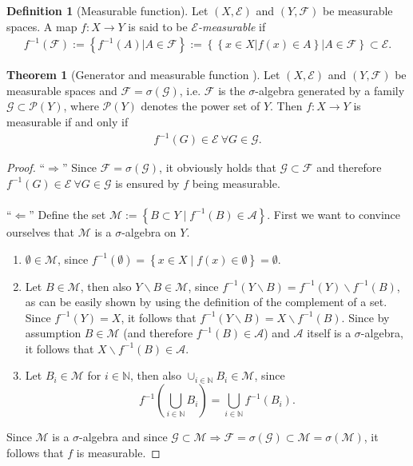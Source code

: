\documentclass[12pt, a4paper]{article}
\numberwithin{equation}{section}
\theoremstyle{definition}
\theoremstyle{definition}
\newtheorem{defn}[thm]{Definition} %
\newtheorem{theorem}[thm]{Theorem}
\begin{document}
	\begin{defn}[Measurable function]
		Let $(X, \mathcal E)$ and $(Y, \mathcal F)$ be measurable spaces. A map $f: X\rightarrow Y$ is said to be \textit{$\mathcal E$-measurable} if 
		\begin{align} \label{measurable-mapping-eq}
			f^{-1}(\mathcal F) := \left\{ f^{-1}(A) \vert A\in \mathcal F \right\} := \left\{ \left\{ x\in X \vert f(x) \in A \right\} \vert A\in \mathcal F \right\} \subset \mathcal E.
		\end{align} 
	\end{defn}

	\begin{theorem}[Generator and measurable function \cite{measurable-functions}] \label{generator-and-measurable-function} Let $(X, \mathcal E)$ and $(Y, \mathcal F)$ be measurable spaces and $\mathcal F = \sigma(\mathcal G)$, i.e. $\mathcal F$ is the $\sigma$-algebra generated by a family $\mathcal G \subset \mathcal P(Y)$, where $\mathcal P(Y)$ denotes the power set of $Y$. Then $f: X\rightarrow Y$ is measurable if and only if 
		\begin{align}
			f^{-1}\left(G\right) \in \mathcal E \ \forall G\in\mathcal G. 
		\end{align}
	\end{theorem}
	
	\begin{proof}
		\enquote{$\Rightarrow$} Since $\mathcal F = \sigma(\mathcal G)$, it obviously holds that $\mathcal G\subset \mathcal F$ and therefore $f^{-1}(G)\in \mathcal E \ \forall G\in\mathcal G$ is ensured by $f$ being measurable. 
		\\ \\ 
		\enquote{$\Leftarrow$} Define the set $\mathcal M:= \left\{ B\subset Y \mid f^{-1}(B)\in \mathcal A \right\}$. First we want to convince ourselves that $\mathcal M$ is a $\sigma$-algebra on $Y$. 
		\begin{enumerate}
			\item $\emptyset \in \mathcal M$, since $f^{-1}(\emptyset) = \left\{ x\in X \mid f(x)\in \emptyset \right\} = \emptyset$. 
			
			\item Let $B\in \mathcal M$, then also $Y\backslash B\in \mathcal M$, since $f^{-1}\left(Y\backslash B\right) = f^{-1}(Y)\backslash f^{-1}(B)$, as can be easily shown by using the definition of the complement of a set. Since $f^{-1}(Y) = X$, it follows that $f^{-1}(Y\backslash B) = X\backslash f^{-1}(B)$. Since by assumption $B\in \mathcal M$ (and therefore $f^{-1}(B)\in \mathcal A$) and $\mathcal A$ itself is a $\sigma$-algebra, it follows that $X\backslash f^{-1}(B)\in\mathcal A$. 
			
			\item  Let $B_i \in \mathcal M$ for $i\in \mathbb N$, then also $\cup_{i\in\mathbb N}B_i\in \mathcal M$, since $$f^{-1}\left(\bigcup_{i\in\mathbb N}B_i\right) = \bigcup_{i\in\mathbb N}f^{-1}\left(B_i\right).$$ 
		\end{enumerate}
		Since $\mathcal M$ is a $\sigma$-algebra and since $\mathcal G\subset \mathcal M \Rightarrow \mathcal F = \sigma(\mathcal G)\subset \mathcal M = \sigma(\mathcal M) $, it follows that $f$ is measurable. 
	\end{proof}
\end{document}
